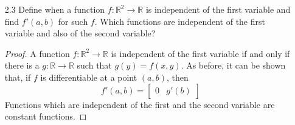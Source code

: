 \begin{enumerate}
    \begin{proof}
    If \( f \) is independent of the second variable, let \( x \in \mathbb{R} \) and set
    \[
    g(x) = f(x,x) = f(x,y)
    \]
    Thus \( f(x,y) = g(x) \). On the other hand, if \( g: \mathbb{R} \rightarrow \mathbb{R} \) is a function such that \( f(x,y) = g(x) \), then
    \[
    f(x,y_1) = g(x) = f(x,y_2) 
    \]
    implying that \( f \) is independent of the second variable. Now, assuming that \( f \) is differentiable at \( (a,b) \), we claim 
    \[
    f'(a,b) = \begin{bmatrix} g'(a) & 0 \end{bmatrix}
    \]
    To demonstrate, we see that there is a unique linear \( \lambda: \mathbb{R}^2 \rightarrow \mathbb{R} \) such that 
    \begin{align*}
        0 &= \lim_{(h,k)\rightarrow 0} \frac{\left| f(a+h,b+k)-f(a,b)-\lambda(h,k) \right|}{\left| (h,k) \right|} \\
        &= \lim_{h \rightarrow 0} \frac{\left| g(a+h)-g(a)-\lambda(h,k) \right|}{\left| h \right|}
    \end{align*}
    which implies then that \( g'(a) \) exists and
    \[
    \lambda(h,k) = g'(a) \cdot h = \begin{bmatrix} g'(a) & 0 \end{bmatrix} \begin{bmatrix} h \\ k \end{bmatrix}
    \]
    Thus
    \[
    f'(a,b) = \begin{bmatrix} g'(a) & 0 \end{bmatrix}
    \]
    \end{proof}
    
    \item[2.3] Define when a function \( f: \mathbb{R}^2 \rightarrow \mathbb{R} \) is independent of the first variable and find \( f'(a,b) \) for such \( f \). Which functions are independent of the first variable and also of the second variable?
    
    \begin{proof}
    A function \( f: \mathbb{R}^2 \rightarrow \mathbb{R} \) is independent of the first variable if and only if there is a \( g: \mathbb{R} \rightarrow \mathbb{R} \) such that \( g(y) = f(x,y) \). As before, it can be shown that, if \( f \) is differentiable at a point \( (a,b) \), then
    \[
    f'(a,b) = \begin{bmatrix} 0 & g'(b) \end{bmatrix}
    \]
    Functions which are independent of the first and the second variable are constant functions. 
    \end{proof}
    

\end{enumerate}
